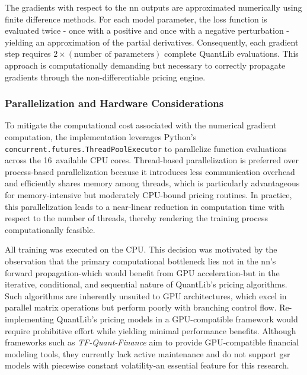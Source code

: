 The gradients with respect to the \ac{nn} outputs are approximated numerically using finite difference methods. For each model parameter, the loss function is evaluated twice - once with a positive and once with a negative perturbation - yielding an approximation of the partial derivatives. Consequently, each gradient step requires $2 \times (\text{number of parameters})$ complete QuantLib evaluations. This approach is computationally demanding but necessary to correctly propagate gradients through the non-differentiable pricing engine.

\subsubsection{Parallelization and Hardware Considerations}
To mitigate the computational cost associated with the numerical gradient computation, the implementation leverages Python's \texttt{concurrent.futures.ThreadPoolExecutor} to parallelize function evaluations across the 16~available CPU cores. Thread-based parallelization is preferred over process-based parallelization because it introduces less communication overhead and efficiently shares memory among threads, which is particularly advantageous for memory-intensive but moderately CPU-bound pricing routines. In practice, this parallelization leads to a near-linear reduction in computation time with respect to the number of threads, thereby rendering the training process computationally feasible.

All training was executed on the CPU. This decision was motivated by the observation that the primary computational bottleneck lies not in the \ac{nn}'s forward propagation-which would benefit from GPU acceleration-but in the iterative, conditional, and sequential nature of QuantLib's pricing algorithms. Such algorithms are inherently unsuited to GPU architectures, which excel in parallel matrix operations but perform poorly with branching control flow. Re-implementing QuantLib's pricing models in a GPU-compatible framework would require prohibitive effort while yielding minimal performance benefits. Although frameworks such as \textit{TF-Quant-Finance} aim to provide GPU-compatible financial modeling tools, they currently lack active maintenance and do not support \ac{gsr} models with piecewise constant volatility-an essential feature for this research.


